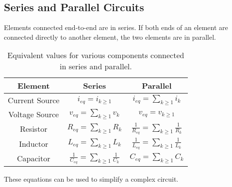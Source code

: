 \documentclass{article}
\begin{document}
\subsection{Series and Parallel Circuits}
\begin{definition}
    Elements connected end-to-end are in series. If both ends of an element are connected directly to another element, the two elements are in parallel.
\end{definition}
\begin{table}[H]
    \centering
    \begin{tabular}{c | c c}
        \toprule
        \textbf{Element} & \textbf{Series}                                                & \textbf{Parallel}                                              \\
        \midrule
        Current Source   & $\displaystyle i_{eq} = i_{k\geq1}$                            & $i_{eq} = \displaystyle \sum_{k\geq1} i_k$                     \\
        Voltage Source   & $\displaystyle v_{eq} = \sum_{k\geq1} v_k$                     & $\displaystyle v_{eq} = v_{k\geq1}$                            \\
        Resistor         & $\displaystyle R_{eq} = \sum_{k\geq1} R_k$                     & $\displaystyle \frac{1}{R_{eq}} = \sum_{k\geq1} \frac{1}{R_k}$ \\
        Inductor         & $\displaystyle L_{eq} = \sum_{k\geq1} L_k$                     & $\displaystyle \frac{1}{L_{eq}} = \sum_{k\geq1} \frac{1}{L_k}$ \\
        Capacitor        & $\displaystyle \frac{1}{C_{eq}} = \sum_{k\geq1} \frac{1}{C_k}$ & $\displaystyle C_{eq} = \sum_{k\geq1} C_k$                     \\
        \bottomrule
    \end{tabular}
    \caption{Equivalent values for various components connected in series and parallel.}
\end{table}
These equations can be used to simplify a complex circuit.
\end{document}

